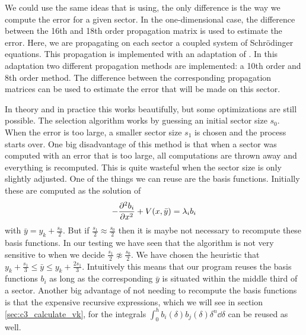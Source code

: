 We could use the same ideas that \matslise{} is using, the only difference is the way we compute the error for a given sector. In the one-dimensional case, the difference between the 16th and 18th order propagation matrix is used to estimate the error. Here, we are propagating on each sector a coupled system of Schrödinger equations. This propagation is implemented with an adaptation of \matscs{} \cite{ledoux_numerical_2007}. In this adaptation two different propagation methods are implemented: a 10th order and 8th order method. The difference between the corresponding propagation matrices can be used to estimate the error that will be made on this sector.

In theory and in practice this works beautifully, but some optimizations are still possible. The selection algorithm works by guessing an initial sector size $s_0$. When the error is too large, a smaller sector size $s_1$ is chosen and the process starts over. One big disadvantage of this method is that when a sector was computed with an error that is too large, all computations are thrown away and everything is recomputed. This is quite wasteful when the sector size is only slightly adjusted. One of the things we can reuse are the basis functions. Initially these are computed as the solution of
$$
  -\pdv[2]{b_i}{x} + V(x, \bar{y}) = \lambda_i b_i
$$
with $\bar{y} = y_{k} + \frac{s_0}{2}$. But if $\frac{s_1}{2} \approx \frac{s_0}{2}$ then it is maybe not necessary to recompute these basis functions. In our testing we have seen that the algorithm is not very sensitive to when we decide $\frac{s_1}{2} \not\approx \frac{s_0}{2}$. We have chosen the heuristic that $y_k + \frac{s_1}{3} \leq \bar{y} \leq y_k + \frac{2 s_1}{3}$. Intuitively this means that our program reuses the basis functions $b_i$ as long as the corresponding $\bar{y}$ is situated within the middle third of a sector. Another big advantage of not needing to recompute the basis functions is that the expensive recursive expressions, which we will see in section \ref{sec:c3_calculate_vk}, for the integrals $\int_{0}^{h} b_i(\delta)b_j(\delta)\delta^n \dd \delta $ can be reused as well.


